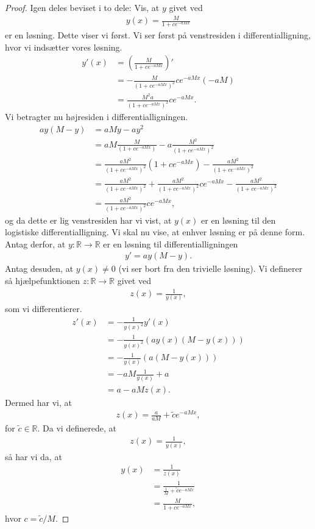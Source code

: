 \begin{proof}
	Igen deles beviset i to dele: Vis, at $y$ givet ved
	\begin{align*}
		y(x) = \frac{M}{1+ce^{-aMx}}
	\end{align*}
	er en løsning. Dette viser vi først. Vi ser først på venstresiden i differentialligning, hvor vi indsætter vores løsning.
	\begin{align*}
		y'(x) &= \left( \frac{M}{1+ce^{-aMx}}\right)'\\
		&= -\frac{M}{(1+ce^{-aMx})^2}ce^{-aMx}(-aM)\\
		&= \frac{M^2a}{(1+ce^{-aMx})^2}ce^{-aMx}.
	\end{align*}
	Vi betragter nu højresiden i differentialligningen.
	\begin{align*}
		ay(M-y) &= aMy - ay^2 \\
		&= aM\frac{M}{(1+ce^{-aMx})} - a\frac{M^2}{(1+ce^{-aMx})^2}\\
		&= \frac{aM^2}{(1+ce^{-aMx})^2}(1+ce^{-aMx}) - \frac{aM^2}{(1+ce^{-aMx})^2} \\
		&= \frac{aM^2}{(1+ce^{-aMx})^2} + \frac{aM^2}{(1+ce^{-aMx})^2}ce^{-aMx} - \frac{aM^2}{(1+ce^{-aMx})^2} \\
		&= \frac{aM^2}{(1+ce^{-aMx})^2}ce^{-aMx},
	\end{align*}
	og da dette er lig venstresiden har vi vist, at $y(x)$ er en løsning til den logistiske differentialligning.
	Vi skal nu vise, at enhver løsning er på denne form. 	Antag derfor, at $y:\mathbb{R} \to \mathbb{R}$ er en løsning til differentialligningen
	\begin{align*}
		y' = ay(M-y).
	\end{align*}
	Antag desuden, at $y(x)\neq 0$ (vi ser bort fra den trivielle løsning). Vi definerer så hjælpefunktionen $z:\mathbb{R} \to \mathbb{R}$ givet ved
	\begin{align*}
		z(x) = \frac{1}{y(x)},
	\end{align*}
	som vi differentierer.
	\begin{align*}
		z'(x) &= -\frac{1}{y(x)^2}y'(x)\\
		&= -\frac{1}{y(x)^2}(ay(x)(M-y(x)))\\
		&= -\frac{1}{y(x)}(a(M-y(x)))\\
		&= -aM \frac{1}{y(x)} + a\\
		&= a-aMz(x).
	\end{align*}
	Dermed har vi, at 
	\begin{align*}
		z(x) = \frac{a}{aM} + \tilde{c}e^{-aMx},
	\end{align*}
	for $\tilde{c} \in \mathbb{R}$. Da vi definerede, at 
	\begin{align*}
		z(x) = \frac{1}{y(x)}, 
	\end{align*}
	så har vi da, at
	\begin{align*}
		y(x) &= \frac{1}{z(x)}\\
		&= \frac{1}{\frac{1}{M}+\tilde{c}e^{-aMx}}\\
		&= \frac{M}{1+ce^{-aMx}},
	\end{align*}
	hvor $c = \tilde{c}/M$.
\end{proof}

